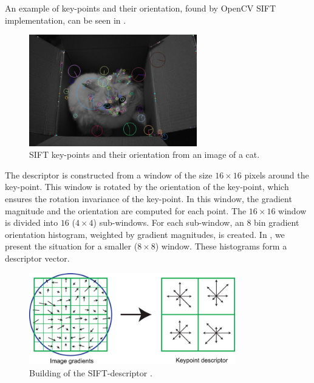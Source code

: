 An example of key-points and their orientation, found by OpenCV SIFT implementation, can be seen in .
\begin{figure}[ht!]
    \centering
    \includegraphics[width=0.65\textwidth]{Figures/sift/sift_example.jpg}
    \caption[SIFT key-points and their orientation from an image of a cat]{SIFT key-points and their orientation from an image of a cat.}
    \label{fig:sift_example}
\end{figure}

The descriptor is constructed from a window of the size $16\times16$ pixels around the key-point. This window is rotated by the orientation of the key-point, which ensures the rotation invariance of the key-point. In this window, the gradient magnitude and the orientation are computed for each point. The $16\times16$ window is divided into $16$ ($4\times4$) sub-windows. For each sub-window, an $8$ bin gradient orientation histogram, weighted by gradient magnitudes, is created. In , we present the situation for a smaller ($8\times8$) window. These histograms form a descriptor vector.

\begin{figure}
    \centering
    \includegraphics[width=0.8\textwidth]{Figures/sift/descriptor.jpg}
    \caption[Extracting the sift-descriptor.]{Building of the SIFT-descriptor \cite{Lowe2004}.}
    \label{fig:sift_descriptor}
\end{figure}
